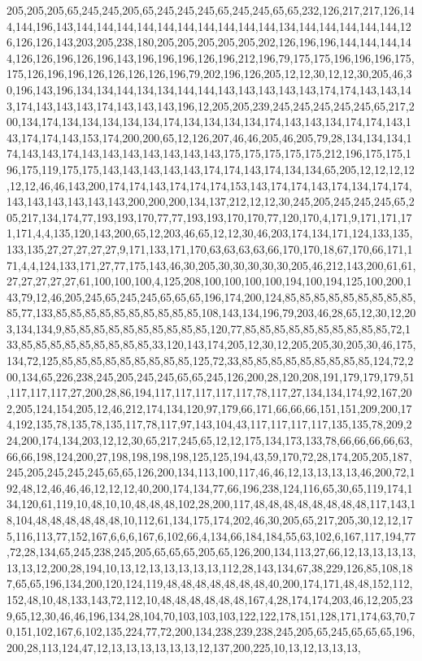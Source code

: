 205,205,205,65,245,245,205,65,245,245,245,65,245,245,65,65,232,126,217,217,126,144,144,196,143,144,144,144,144,144,144,144,144,144,144,134,144,144,144,144,144,126,126,126,143,203,205,238,180,205,205,205,205,205,202,126,196,196,144,144,144,144,126,126,196,126,196,143,196,196,196,126,196,212,196,79,175,175,196,196,196,175,175,126,196,196,126,126,126,126,196,79,202,196,126,205,12,12,30,12,12,30,205,46,30,196,143,196,134,134,144,134,134,144,144,143,143,143,143,143,174,174,143,143,143,174,143,143,143,174,143,143,143,196,12,205,205,239,245,245,245,245,245,65,217,200,134,174,134,134,134,134,134,174,134,134,134,134,174,143,143,134,174,174,143,143,174,174,143,153,174,200,200,65,12,126,207,46,46,205,46,205,79,28,134,134,134,174,143,143,174,143,143,143,143,143,143,143,175,175,175,175,175,212,196,175,175,196,175,119,175,175,143,143,143,143,143,174,174,143,174,134,134,65,205,12,12,12,12,12,12,46,46,143,200,174,174,143,174,174,174,153,143,174,174,143,174,134,174,174,143,143,143,143,143,143,200,200,200,134,137,212,12,12,30,245,205,245,245,245,65,205,217,134,174,77,193,193,170,77,77,193,193,170,170,77,120,170,4,171,9,171,171,171,171,4,4,135,120,143,200,65,12,203,46,65,12,12,30,46,203,174,134,171,124,133,135,133,135,27,27,27,27,27,9,171,133,171,170,63,63,63,63,66,170,170,18,67,170,66,171,171,4,4,124,133,171,27,77,175,143,46,30,205,30,30,30,30,30,205,46,212,143,200,61,61,27,27,27,27,27,61,100,100,100,4,125,208,100,100,100,100,194,100,194,125,100,200,143,79,12,46,205,245,65,245,245,65,65,65,196,174,200,124,85,85,85,85,85,85,85,85,85,85,77,133,85,85,85,85,85,85,85,85,85,85,108,143,134,196,79,203,46,28,65,12,30,12,203,134,134,9,85,85,85,85,85,85,85,85,85,85,120,77,85,85,85,85,85,85,85,85,85,85,72,133,85,85,85,85,85,85,85,85,85,33,120,143,174,205,12,30,12,205,205,30,205,30,46,175,134,72,125,85,85,85,85,85,85,85,85,85,125,72,33,85,85,85,85,85,85,85,85,85,124,72,200,134,65,226,238,245,205,245,245,65,65,245,126,200,28,120,208,191,179,179,179,51,117,117,117,27,200,28,86,194,117,117,117,117,117,78,117,27,134,134,174,92,167,202,205,124,154,205,12,46,212,174,134,120,97,179,66,171,66,66,66,151,151,209,200,174,192,135,78,135,78,135,117,78,117,97,143,104,43,117,117,117,117,135,135,78,209,224,200,174,134,203,12,12,30,65,217,245,65,12,12,175,134,173,133,78,66,66,66,66,63,66,66,198,124,200,27,198,198,198,198,125,125,194,43,59,170,72,28,174,205,205,187,245,205,245,245,245,65,65,126,200,134,113,100,117,46,46,12,13,13,13,13,46,200,72,192,48,12,46,46,46,12,12,12,40,200,174,134,77,66,196,238,124,116,65,30,65,119,174,134,120,61,119,10,48,10,10,48,48,48,102,28,200,117,48,48,48,48,48,48,48,48,117,143,18,104,48,48,48,48,48,48,10,112,61,134,175,174,202,46,30,205,65,217,205,30,12,12,175,116,113,77,152,167,6,6,6,167,6,102,66,4,134,66,184,184,55,63,102,6,167,117,194,77,72,28,134,65,245,238,245,205,65,65,65,205,65,126,200,134,113,27,66,12,13,13,13,13,13,13,12,200,28,194,10,13,12,13,13,13,13,13,112,28,143,134,67,38,229,126,85,108,187,65,65,196,134,200,120,124,119,48,48,48,48,48,48,48,40,200,174,171,48,48,152,112,152,48,10,48,133,143,72,112,10,48,48,48,48,48,48,167,4,28,174,174,203,46,12,205,239,65,12,30,46,46,196,134,28,104,70,103,103,103,122,122,178,151,128,171,174,63,70,70,151,102,167,6,102,135,224,77,72,200,134,238,239,238,245,205,65,245,65,65,65,196,200,28,113,124,47,12,13,13,13,13,13,13,12,137,200,225,10,13,12,13,13,13,
